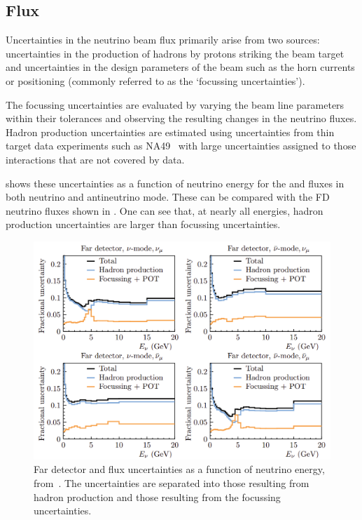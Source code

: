 \subsection{Flux}
\label{sec:dune_lbl:systs:flux}

Uncertainties in the neutrino beam flux primarily arise from two sources: uncertainties in the production of hadrons by protons striking the beam target and uncertainties in the design parameters of the beam such as the horn currents or positioning (commonly referred to as the `focussing uncertainties').

The focussing uncertainties are evaluated by varying the beam line parameters within their tolerances and observing the resulting changes in the neutrino fluxes.
Hadron production uncertainties are estimated using uncertainties from thin target data experiments such as NA49~\cite{na49} with large uncertainties assigned to those interactions that are not covered by data.

 shows these uncertainties as a function of neutrino energy for the \numu and \anumu fluxes in both neutrino and antineutrino mode.
These can be compared with the FD neutrino fluxes shown in .
One can see that, at nearly all energies, hadron production uncertainties are larger than focussing uncertainties.

\begin{figure}[h]
  \centering
  \includegraphics[width=.8\linewidth]{files/figures/dune_detector/fluxUncertainties}
  \caption[Far detector flux uncertainties for \numu and \anumu]{Far detector \numu and \anumu flux uncertainties as a function of neutrino energy, from~\cite{tdrVol2}. The uncertainties are separated into those resulting from hadron production and those resulting from the focussing uncertainties.}
  \label{fig:fluxUncertainties}
\end{figure}


